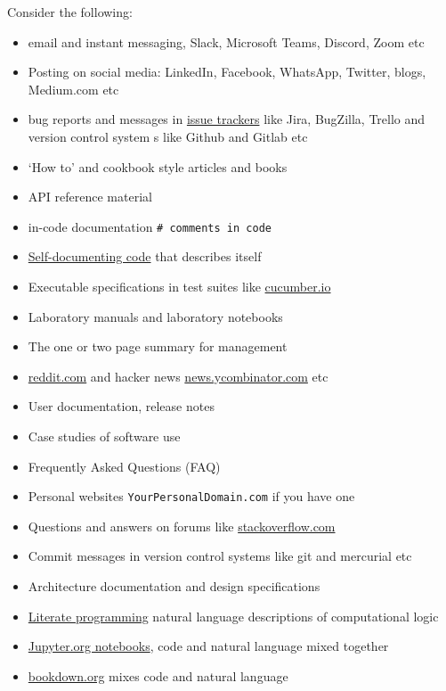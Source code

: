 \documentclass[
]{book}
\providecommand{\tightlist}{%
  \setlength{\itemsep}{0pt}\setlength{\parskip}{0pt}}
\begin{document}
Consider the following:

\begin{itemize}
\tightlist
\item
  email and instant messaging, Slack, Microsoft Teams, Discord, Zoom etc
\item
  Posting on social media: LinkedIn, Facebook, WhatsApp, Twitter, blogs, Medium.com etc
\item
  bug reports and messages in \href{https://en.wikipedia.org/wiki/Comparison_of_issue-tracking_systems}{issue trackers} like Jira, BugZilla, Trello and version control system s like Github and Gitlab etc
\item
  `How to' and cookbook style articles and books
\item
  API reference material
\item
  in-code documentation \texttt{\#\ comments\ in\ code}
\item
  \href{https://en.wikipedia.org/wiki/Self-documenting_code}{Self-documenting code} that describes itself
\item
  Executable specifications in test suites like \href{https://en.wikipedia.org/wiki/Cucumber_(software)}{cucumber.io}
\item
  Laboratory manuals and laboratory notebooks
\item
  The one or two page summary for management
\item
  \href{https://www.reddit.com/}{reddit.com} and hacker news \href{https://news.ycombinator.com/}{news.ycombinator.com} etc
\item
  User documentation, release notes
\item
  Case studies of software use
\item
  Frequently Asked Questions (FAQ)
\item
  Personal websites \texttt{YourPersonalDomain.com} if you have one
\item
  Questions and answers on forums like \href{https://stackoverflow.com/}{stackoverflow.com}
\item
  Commit messages in version control systems like git and mercurial etc
\item
  Architecture documentation and design specifications
\item
  \href{https://en.wikipedia.org/wiki/Literate_programming}{Literate programming} natural language descriptions of computational logic \citep{knuthlit}
\item
  \href{https://jupyter.org/}{Jupyter.org notebooks}, code and natural language mixed together
\item
  \href{https://bookdown.org/}{bookdown.org} mixes code and natural language
\end{itemize}
\end{document}

